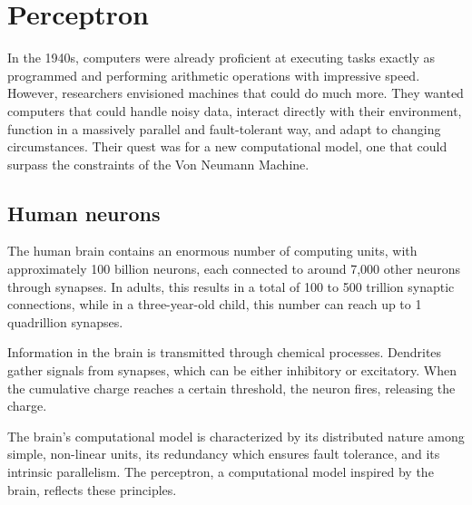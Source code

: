 \section{Perceptron}

In the 1940s, computers were already proficient at executing tasks exactly as programmed and performing arithmetic operations with impressive speed. 
However, researchers envisioned machines that could do much more. 
They wanted computers that could handle noisy data, interact directly with their environment, function in a massively parallel and fault-tolerant way, and adapt to changing circumstances. 
Their quest was for a new computational model, one that could surpass the constraints of the Von Neumann Machine.

\subsection{Human neurons}
The human brain contains an enormous number of computing units, with approximately 100 billion neurons, each connected to around 7,000 other neurons through synapses. 
In adults, this results in a total of 100 to 500 trillion synaptic connections, while in a three-year-old child, this number can reach up to 1 quadrillion synapses.

Information in the brain is transmitted through chemical processes. 
Dendrites gather signals from synapses, which can be either inhibitory or excitatory.
When the cumulative charge reaches a certain threshold, the neuron fires, releasing the charge.

The brain's computational model is characterized by its distributed nature among simple, non-linear units, its redundancy which ensures fault tolerance, and its intrinsic parallelism. 
The perceptron, a computational model inspired by the brain, reflects these principles.

